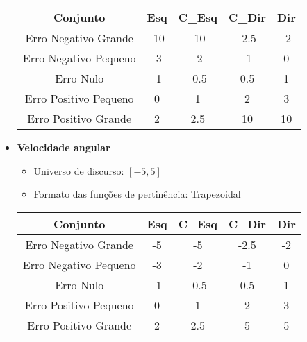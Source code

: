 \begin{itemize}
            \begin{table}[H]
                \centering
                \begin{tabular}{|c|c|c|c|c|}
                    \hline
                    Conjunto               & Esq   & C\_Esq & C\_Dir & Dir \\ \hline
                    Erro Negativo Grande   & -10   & -10   & -2.5  & -2    \\
                    Erro Negativo Pequeno  & -3    & -2    & -1    & 0     \\
                    Erro  Nulo             & -1    & -0.5  & 0.5   & 1     \\
                    Erro Positivo Pequeno  & 0     & 1     & 2     & 3     \\
                    Erro Positivo Grande   & 2     & 2.5   & 10    & 10    \\ \hline
                \end{tabular}
            \end{table}
            
        \item{\bf{Velocidade angular}}
            \begin{itemize}
                \item Universo de discurso: $[-5,5]$
                \item Formato das funções de pertinência: Trapezoidal
            \end{itemize}

            \begin{table}[H]
                \centering
                \begin{tabular}{|c|c|c|c|c|}
                    \hline
                    Conjunto               & Esq   & C\_Esq & C\_Dir & Dir \\ \hline
                    Erro Negativo Grande   & -5    & -5    & -2.5  & -2    \\
                    Erro Negativo Pequeno  & -3    & -2    & -1    & 0     \\
                    Erro  Nulo             & -1    & -0.5  & 0.5   & 1     \\
                    Erro Positivo Pequeno  & 0     & 1     & 2     & 3     \\
                    Erro Positivo Grande   & 2     & 2.5   & 5     & 5     \\ \hline
                \end{tabular}
            \end{table}
            

\end{itemize}
